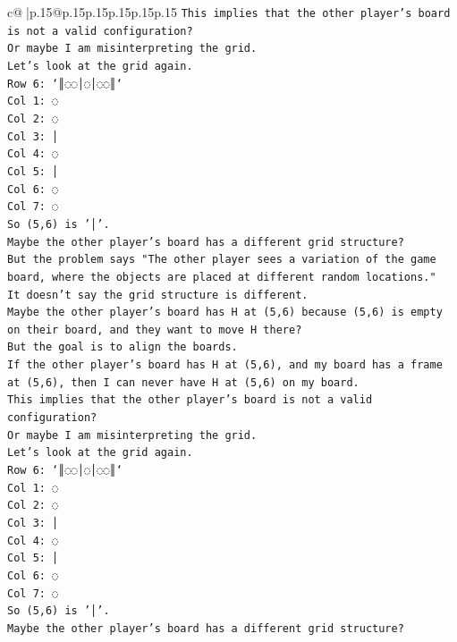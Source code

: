 \documentclass{article}
\begin{document}
{\begin{supertabular}{c@{$\;$}|p{.15\linewidth}@{}p{.15\linewidth}p{.15\linewidth}p{.15\linewidth}p{.15\linewidth}p{.15\linewidth}}
{{{\texttt{This implies that the other player's board is not a valid configuration?} \\
\texttt{Or maybe I am misinterpreting the grid.} \\
\texttt{Let's look at the grid again.} \\
\texttt{Row 6: `║◌◌│◌│◌◌║`} \\
\texttt{Col 1: ◌} \\
\texttt{Col 2: ◌} \\
\texttt{Col 3: │} \\
\texttt{Col 4: ◌} \\
\texttt{Col 5: │} \\
\texttt{Col 6: ◌} \\
\texttt{Col 7: ◌} \\
\texttt{So (5,6) is '│'.} \\
\texttt{Maybe the other player's board has a different grid structure?} \\
\texttt{But the problem says "The other player sees a variation of the game board, where the objects are placed at different random locations."} \\
\texttt{It doesn't say the grid structure is different.} \\
\texttt{Maybe the other player's board has H at (5,6) because (5,6) is empty on their board, and they want to move H there?} \\
\texttt{But the goal is to align the boards.} \\
\texttt{If the other player's board has H at (5,6), and my board has a frame at (5,6), then I can never have H at (5,6) on my board.} \\
\texttt{This implies that the other player's board is not a valid configuration?} \\
\texttt{Or maybe I am misinterpreting the grid.} \\
\texttt{Let's look at the grid again.} \\
\texttt{Row 6: `║◌◌│◌│◌◌║`} \\
\texttt{Col 1: ◌} \\
\texttt{Col 2: ◌} \\
\texttt{Col 3: │} \\
\texttt{Col 4: ◌} \\
\texttt{Col 5: │} \\
\texttt{Col 6: ◌} \\
\texttt{Col 7: ◌} \\
\texttt{So (5,6) is '│'.} \\
\texttt{Maybe the other player's board has a different grid structure?} \\
}}}
\end{supertabular}}
\end{document}

